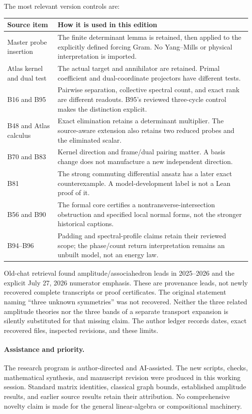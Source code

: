 \documentclass[11pt,letterpaper]{article}
\theoremstyle{definition}
\theoremstyle{remark}\newtheorem{remark}[theorem]{Remark}
\begin{document}
The most relevant version controls are:
\begin{longtable}{p{}p{}}\toprule
Source item&How it is used in this edition\\\midrule\endhead
Master probe insertion&The finite determinant lemma is retained, then applied to the explicitly defined forcing Gram. No Yang--Mills or physical interpretation is imported.\\
Atlas kernel and dual test&The actual target and annihilator are retained. Primal coefficient and dual-coordinate projectors have different tests.\\
B16 and B95&Pairwise separation, collective spectral count, and exact rank are different readouts. B95's reviewed three-cycle control makes the distinction explicit.\\
B48 and Atlas calculus&Exact elimination retains a determinant multiplier. The source-aware extension also retains two reduced probes and the eliminated scalar.\\
B70 and B83&Kernel direction and frame/dual pairing matter. A basis change does not manufacture a new independent direction.\\
B81&The strong commuting differential ansatz has a later exact counterexample. A model-development label is not a Lean proof of it.\\
B56 and B90&The formal core certifies a nontransverse-intersection obstruction and specified local normal forms, not the stronger historical captions.\\
B94--B96&Padding and spectral-profile claims retain their reviewed scope; the phase/count return interpretation remains an unbuilt model, not an energy law.\\
\bottomrule\end{longtable}
Old-chat retrieval found amplitude/associahedron leads in 2025--2026 and the explicit July 27, 2026 numerator emphasis. These are provenance leads, not newly recovered complete transcripts or proof certificates. The original statement naming ``three unknown symmetries'' was not recovered. Neither the three related amplitude theories nor the three bands of a separate transport expansion is silently substituted for that missing claim. The author ledger records dates, exact recovered files, inspected revisions, and these limits.

\paragraph{Assistance and priority.} The research program is author-directed and AI-assisted. The new scripts, checks, mathematical synthesis, and manuscript revision were produced in this working session. Standard matrix identities, classical graph bounds, established amplitude results, and earlier source results retain their attribution. No comprehensive novelty claim is made for the general linear-algebra or compositional machinery.
\end{document}
